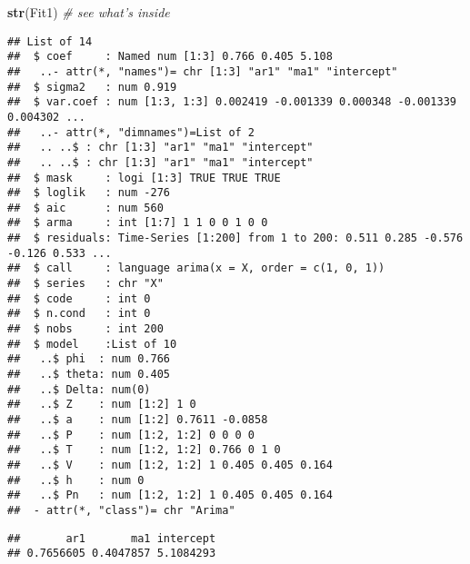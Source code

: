 \documentclass[]{article}
\newenvironment{Shaded}{\begin{snugshade}}{\end{snugshade}}
\newcommand{\CommentTok}[1]{\textcolor[rgb]{0.56,0.35,0.01}{\textit{#1}}}
\newcommand{\KeywordTok}[1]{\textcolor[rgb]{0.13,0.29,0.53}{\textbf{#1}}}
\newcommand{\NormalTok}[1]{#1}
\newcommand{\OperatorTok}[1]{\textcolor[rgb]{0.81,0.36,0.00}{\textbf{#1}}}
\begin{document}
\begin{Shaded}
\begin{Highlighting}[]
  \KeywordTok{str}\NormalTok{(Fit1)          }\CommentTok{# see what's inside}
\end{Highlighting}
\end{Shaded}

\begin{verbatim}
## List of 14
##  $ coef     : Named num [1:3] 0.766 0.405 5.108
##   ..- attr(*, "names")= chr [1:3] "ar1" "ma1" "intercept"
##  $ sigma2   : num 0.919
##  $ var.coef : num [1:3, 1:3] 0.002419 -0.001339 0.000348 -0.001339 0.004302 ...
##   ..- attr(*, "dimnames")=List of 2
##   .. ..$ : chr [1:3] "ar1" "ma1" "intercept"
##   .. ..$ : chr [1:3] "ar1" "ma1" "intercept"
##  $ mask     : logi [1:3] TRUE TRUE TRUE
##  $ loglik   : num -276
##  $ aic      : num 560
##  $ arma     : int [1:7] 1 1 0 0 1 0 0
##  $ residuals: Time-Series [1:200] from 1 to 200: 0.511 0.285 -0.576 -0.126 0.533 ...
##  $ call     : language arima(x = X, order = c(1, 0, 1))
##  $ series   : chr "X"
##  $ code     : int 0
##  $ n.cond   : int 0
##  $ nobs     : int 200
##  $ model    :List of 10
##   ..$ phi  : num 0.766
##   ..$ theta: num 0.405
##   ..$ Delta: num(0) 
##   ..$ Z    : num [1:2] 1 0
##   ..$ a    : num [1:2] 0.7611 -0.0858
##   ..$ P    : num [1:2, 1:2] 0 0 0 0
##   ..$ T    : num [1:2, 1:2] 0.766 0 1 0
##   ..$ V    : num [1:2, 1:2] 1 0.405 0.405 0.164
##   ..$ h    : num 0
##   ..$ Pn   : num [1:2, 1:2] 1 0.405 0.405 0.164
##  - attr(*, "class")= chr "Arima"
\end{verbatim}

\begin{Shaded}
\end{Shaded}

\begin{verbatim}
##       ar1       ma1 intercept 
## 0.7656605 0.4047857 5.1084293
\end{verbatim}

\begin{Shaded}
\end{Shaded}
\end{document}
